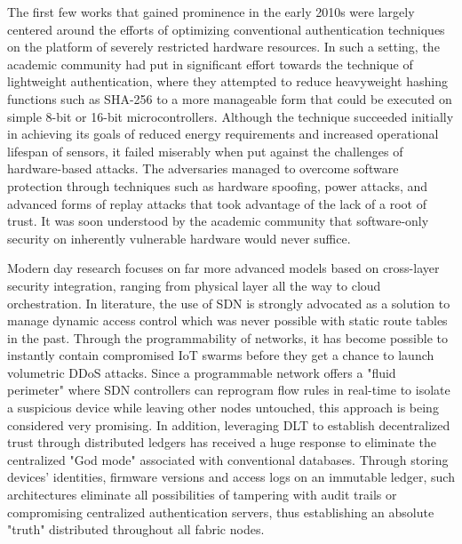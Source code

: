 \documentclass[12pt]{article}
\begin{document}
The first few works that gained prominence in the early 2010s were largely centered around the efforts of optimizing conventional authentication techniques on the platform of severely restricted hardware resources. In such a setting, the academic community had put in significant effort towards the technique of lightweight authentication, where they attempted to reduce heavyweight hashing functions such as SHA-256 to a more manageable form that could be executed on simple 8-bit or 16-bit microcontrollers. Although the technique succeeded initially in achieving its goals of reduced energy requirements and increased operational lifespan of sensors, it failed miserably when put against the challenges of hardware-based attacks. The adversaries managed to overcome software protection through techniques such as hardware spoofing, power attacks, and advanced forms of replay attacks that took advantage of the lack of a root of trust. It was soon understood by the academic community that software-only security on inherently vulnerable hardware would never suffice.

Modern day research focuses on far more advanced models based on cross-layer security integration, ranging from physical layer all the way to cloud orchestration. In literature, the use of SDN is strongly advocated as a solution to manage dynamic access control which was never possible with static route tables in the past. Through the programmability of networks, it has become possible to instantly contain compromised IoT swarms before they get a chance to launch volumetric DDoS attacks. Since a programmable network offers a "fluid perimeter" where SDN controllers can reprogram flow rules in real-time to isolate a suspicious device while leaving other nodes untouched, this approach is being considered very promising. In addition, leveraging DLT to establish decentralized trust through distributed ledgers has received a huge response to eliminate the centralized "God mode" associated with conventional databases. Through storing devices' identities, firmware versions and access logs on an immutable ledger, such architectures eliminate all possibilities of tampering with audit trails or compromising centralized authentication servers, thus establishing an absolute "truth" distributed throughout all fabric nodes.
\end{document}
